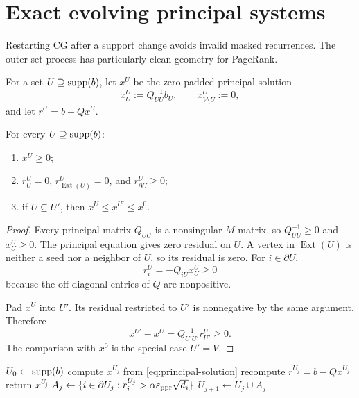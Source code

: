 \documentclass[11pt]{article}
\begin{document}
\section{Exact evolving principal systems}
\label{sec:principal}

Restarting CG after a support change avoids invalid masked recurrences. The
outer set process has particularly clean geometry for PageRank.

For a set $U\supseteq\operatorname{supp}(b)$, let $x^U$ be the zero-padded principal
solution
\begin{equation}
 x^U_U:=Q_{UU}^{-1}b_U,
 \qquad
 x^U_{V\setminus U}:=0,
 \label{eq:principal-solution}
\end{equation}
and let $r^U=b-Qx^U$.

\begin{theorem}
\label{thm:principal-geometry}
For every $U\supseteq\operatorname{supp}(b)$:
\begin{enumerate}[leftmargin=*]
 \item $x^U\geq0$;
 \item $r^U_U=0$, $r^U_{\operatorname{Ext}(U)}=0$, and
       $r^U_{\partial U}\geq0$;
 \item if $U\subseteq U'$, then $x^U\leq x^{U'}\leq x^0$.
\end{enumerate}
\end{theorem}

\begin{proof}
Every principal matrix $Q_{UU}$ is a nonsingular $M$-matrix, so
$Q_{UU}^{-1}\geq0$ and $x^U_U\geq0$. The principal equation gives zero
residual on $U$. A vertex in $\operatorname{Ext}(U)$ is neither a seed nor a
neighbor of $U$, so its residual is zero. For $i\in\partial U$,
\begin{equation*}
 r^U_i=-Q_{iU}x^U_U\geq0
\end{equation*}
because the off-diagonal entries of $Q$ are nonpositive.

Pad $x^U$ into $U'$. Its residual restricted to $U'$ is nonnegative by the
same argument. Therefore
\begin{equation*}
 x^{U'}-x^U
 =Q_{U'U'}^{-1}r^U_{U'}\geq0.
\end{equation*}
The comparison with $x^0$ is the special case $U'=V$.
\end{proof}

\begin{algorithm}[t]
\caption{Exact evolving principal-system process}
\label{alg:exact-restarted}
\begin{algorithmic}[1]
\STATE $U_0\gets\operatorname{supp}(b)$
  \STATE compute $x^{U_j}$ from \cref{eq:principal-solution}
  \STATE recompute $r^{U_j}=b-Qx^{U_j}$
    \STATE return $x^{U_j}$
  \ENDIF
  \STATE $A_j\gets\{i\in\partial U_j:r^{U_j}_i>
      \alpha\varepsilon_{\mathrm{ppr}}\sqrt{d_i}\}$
  \STATE $U_{j+1}\gets U_j\cup A_j$
\ENDFOR
\end{algorithmic}
\end{algorithm}
\end{document}
